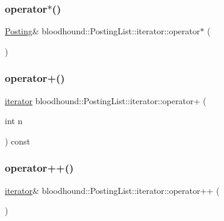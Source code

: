 \subsubsection{\texorpdfstring{operator$\ast$()}{operator*()}}
{\footnotesize\ttfamily \mbox{\hyperlink{structbloodhound_1_1Posting}{Posting}}\& bloodhound\+::\+Posting\+List\+::iterator\+::operator$\ast$ (\begin{DoxyParamCaption}{ }\end{DoxyParamCaption})\hspace{0.3cm}{\ttfamily [inline]}}

\mbox{\label{structbloodhound_1_1PostingList_1_1iterator_a8672fb454e60ed068ae02078976543f9}} 
\subsubsection{\texorpdfstring{operator+()}{operator+()}}
{\footnotesize\ttfamily \mbox{\hyperlink{structbloodhound_1_1PostingList_1_1iterator}{iterator}} bloodhound\+::\+Posting\+List\+::iterator\+::operator+ (\begin{DoxyParamCaption}\item[{int}]{n }\end{DoxyParamCaption}) const\hspace{0.3cm}{\ttfamily [inline]}}

\mbox{\label{structbloodhound_1_1PostingList_1_1iterator_a8b0c2e4221f0ce3ea893c2fc37edbd53}} 
\subsubsection{\texorpdfstring{operator++()}{operator++()}\hspace{0.1cm}{\footnotesize\ttfamily [1/2]}}
{\footnotesize\ttfamily \mbox{\hyperlink{structbloodhound_1_1PostingList_1_1iterator}{iterator}}\& bloodhound\+::\+Posting\+List\+::iterator\+::operator++ (\begin{DoxyParamCaption}{ }\end{DoxyParamCaption})\hspace{0.3cm}{\ttfamily [inline]}}

